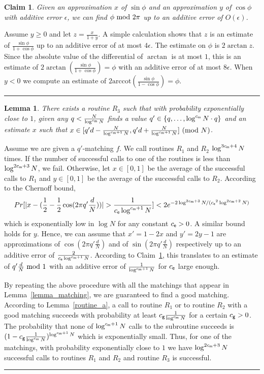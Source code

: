 \documentclass[11pt]{article}
\newtheorem{claim}[theorem]{Claim}
\newtheorem{lemma}[theorem]{Lemma}
\newcommand{\qedsymb}{\hfill{\rule{2mm}{2mm}}}
\newenvironment{proof}{\begin{trivlist}
\item[\hspace{\labelsep}{\sl\noindent Proof:\/}]
}{\qedsymb\end{trivlist}}
\def\mod{{\rm mod}}
\newcommand\C[1]{{ c_{\sf {#1}} }}
\newcommand\alternate[2]{{#1}}
\newcommand\omittedproof[1]{\alternate{#1}{Omitted.}}
\begin{document}
\begin{claim}\label{sincos_estimate}
Given an approximation $x$ of $\sin\phi$ and an approximation $y$ of $\cos\phi$ with additive error $\epsilon$, we can
find $\phi~\mod~2\pi$ up to an additive error of $O(\epsilon)$.
\end{claim}
\begin{proof}\omittedproof{
Assume $y \ge 0$ and let $z=\frac{x}{1+y}$. A simple calculation shows that $z$ is an estimate of
$\frac{\sin\phi}{1+\cos\phi}$ up to an additive error of at most $4\epsilon$. The estimate on $\phi$ is $2\arctan z$.
Since the absolute value of the differential of $\arctan$ is at most $1$, this is an estimate of
$2\arctan(\frac{\sin\phi}{1+\cos\phi})=\phi$ with an additive error of at most $8\epsilon$. When $y < 0$ we compute an
estimate of  $2\mbox{arccot}(\frac{\sin\phi}{1-\cos\phi})=\phi$. }
\end{proof}

\begin{lemma}
There exists a routine $R_3$ such that with probability exponentially close to $1$, given any $q < \frac{N}{\log^{\C{m}}
N}$ finds a value $q' \in \{q,\ldots,\log^{\C{m}}N\cdot q\}$ and an estimate $x$ such that $x \in
[q'd-\frac{N}{\log^{\C{m}+1}N},q'd+\frac{N}{\log^{\C{m}+1}N}]~(\mod~N)$.
\end{lemma}
\begin{proof}\omittedproof{
Assume we are given a $q'$-matching $f$. We call routines $R_1$ and $R_2$ $\log^{3\C{m}+4}N$ times. If the number of
successful calls to one of the routines is less than $\log^{2\C{m}+3}N$, we fail. Otherwise, let $x\in [0,1]$ be the
average of the successful calls to $R_1$ and $y\in [0,1]$ be the average of the successful calls to $R_2$. According to
the Chernoff bound,
 $$Pr[|x-(\frac{1}{2}-\frac{1}{2}\cos(2\pi q' \frac{d}{N})) | > \frac{1}{{\C{e}}\log^{\C{m}+1}N} ] <
       2e^{-2 \log^{2\C{m}+3}N / ({\C{e}}^2\log^{2\C{m}+2}N)}$$
which is exponentially low in $\log N$ for any constant $\C{e}>0$. A similar bound holds for $y$. Hence, we can assume
that $x'=1-2x$ and $y'=2y-1$ are approximations of $\cos(2\pi q' \frac{d}{N})$ and of $\sin(2\pi q' \frac{d}{N})$
respectively up to an additive error of $\frac{2}{\C{e}\log^{\C{m}+1}N}$. According to Claim~\ref{sincos_estimate},
this translates to an estimate of $q' \frac{d}{N}~\mod~1$ with an additive error of $\frac{1}{\log^{\C{m}+1}N}$ for
$\C{e}$ large enough.

By repeating the above procedure with all the matchings that appear in Lemma~\ref{lemma_matching}, we are guaranteed to
find a good matching. According to Lemma~\ref{routine_a}, a call to routine $R_1$ or to routine $R_2$ with a good
matching succeeds with probability at least $\C{g}\frac{1}{\log^{\C{m}} N}$ for a certain $\C{g}>0$. The probability
that none of $\log^{\C{m}+1} N$ calls to the subroutine succeeds is $(1- \C{g}\frac{1}{\log^{\C{m}} N})^{\log^{\C{m}+1}
N}$ which is exponentially small. Thus, for one of the matchings, with probability exponentially close to $1$ we have
$\log^{2\C{m}+3}N$ successful calls to routines $R_1$ and $R_2$ and routine $R_3$ is successful.
}\end{proof}
\end{document}
